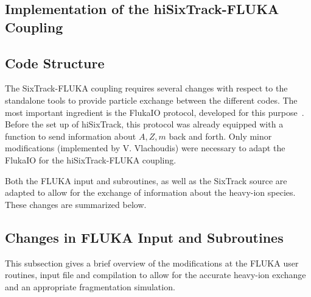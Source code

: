 \begin{appendices}

\section{Implementation of the hiSixTrack-FLUKA Coupling} \label{coupling:imp}

\subsection{Code Structure}

The SixTrack-FLUKA coupling requires several changes with respect to the standalone tools to provide particle exchange between the different codes. The most important ingredient is the FlukaIO protocol, developed for this purpose~\cite{flukaiotwiki}. Before the set up of hiSixTrack, this protocol was already equipped with a function to send information about $A,Z,m$ back and forth. Only minor modifications (implemented by V. Vlachoudis) were necessary to adapt the FlukaIO for the hiSixTrack-FLUKA coupling. 

Both the FLUKA input and subroutines, as well as the SixTrack source are adapted to allow for the exchange of information about the heavy-ion species. These changes are summarized below.


\subsection{Changes in FLUKA Input and Subroutines}

This subsection gives a brief overview of the modifications at the FLUKA user routines, input file and compilation to allow for the accurate heavy-ion exchange and an appropriate fragmentation simulation. 


\end{appendices}
